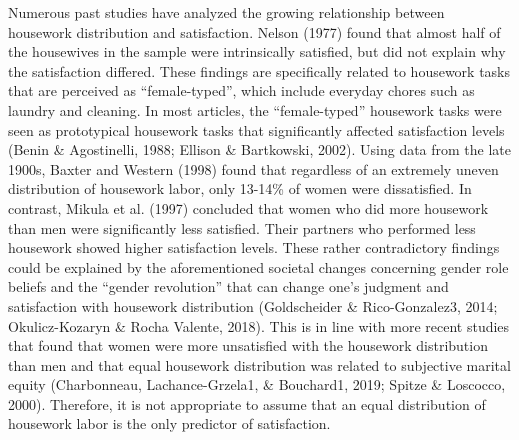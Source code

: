 \documentclass[
  man,floatsintext]{apa6}
\begin{document}
Numerous past studies have analyzed the growing relationship between housework distribution and satisfaction. Nelson (1977) found that almost half of the housewives in the sample were intrinsically satisfied, but did not explain why the satisfaction differed. These findings are specifically related to housework tasks that are perceived as ``female-typed'', which include everyday chores such as laundry and cleaning. In most articles, the ``female-typed'' housework tasks were seen as prototypical housework tasks that significantly affected satisfaction levels (Benin \& Agostinelli, 1988; Ellison \& Bartkowski, 2002). Using data from the late 1900s, Baxter and Western (1998) found that regardless of an extremely uneven distribution of housework labor, only 13-14\% of women were dissatisfied. In contrast, Mikula et al. (1997) concluded that women who did more housework than men were significantly less satisfied. Their partners who performed less housework showed higher satisfaction levels.
These rather contradictory findings could be explained by the aforementioned societal changes concerning gender role beliefs and the ``gender revolution'' that can change one's judgment and satisfaction with housework distribution (Goldscheider \& Rico-Gonzalez3, 2014; Okulicz-Kozaryn \& Rocha Valente, 2018). This is in line with more recent studies that found that women were more unsatisfied with the housework distribution than men and that equal housework distribution was related to subjective marital equity (Charbonneau, Lachance-Grzela1, \& Bouchard1, 2019; Spitze \& Loscocco, 2000). Therefore, it is not appropriate to assume that an equal distribution of housework labor is the only predictor of satisfaction.
\end{document}
